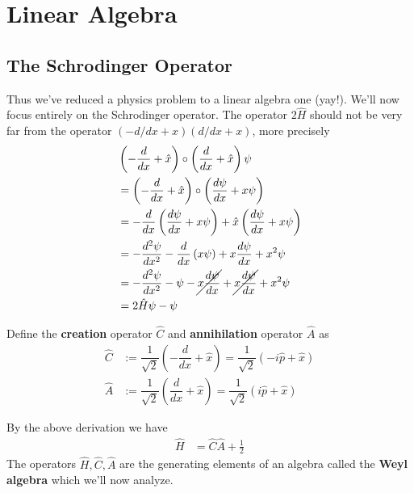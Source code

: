 \section{Linear Algebra}

\subsection{The Schrodinger Operator}
Thus we've reduced a physics problem to a linear algebra one (yay!). We'll now focus entirely on the Schrodinger operator. The operator $2\hat{H}$  should not be very far from the operator $(-d/dx + x)(d/dx + x)$, more precisely
\begin{align*}
	&\left(-\dfrac{d}{dx} + \hat{x}\right) \circ \left(\dfrac{d}{dx} + \hat{x} \right)\psi \\
	&=\left(-\dfrac{d}{dx} + \hat{x}\right) \circ \left(\dfrac{d \psi}{dx} + x \psi \right) \\
	&= -\dfrac{d}{dx}\left( \dfrac{d \psi}{dx} + x \psi \right) + \hat{x} \left( \dfrac{d \psi}{dx} + x \psi \right) \\
	&= -\dfrac{d^2 \psi}{dx^2} -\dfrac{d}{dx} \left(x \psi \right) + x\dfrac{d \psi}{dx} + x^2 \psi \\
	&= -\dfrac{d^2 \psi}{dx^2} -\psi - \cancel{x\dfrac{d\psi}{dx}} + \cancel{x\dfrac{d \psi}{dx}} + x^2 \psi \\
	&= 2\hat{H} \psi - \psi
\end{align*}

\begin{definition}
	Define the \textbf{creation} operator $\hat{C}$ and \textbf{annihilation} operator $\hat{A}$ as
	\begin{align*}
		\hat C &:= \dfrac{1}{\sqrt{2}}\left(-\dfrac{d}{dx} + \hat{x}\right)
		=\dfrac{1}{\sqrt{2}}\left(-i \hat{p} + \hat{x}\right) \\
			\hat A &:= \dfrac{1}{\sqrt{2}}\left(\dfrac{d}{dx} + \hat{x}\right)
		=\dfrac{1}{\sqrt{2}}\left(i \hat{p} + \hat{x}\right)
	\end{align*}
\end{definition}
\noindent By the above derivation we have
\begin{align*}
	\hat{H} &= \hat{C} \hat{A} + \frac{1}{2}
\end{align*}
The operators $\hat{H}, \hat{C}, \hat{A}$ are the generating elements of an algebra called the \textbf{Weyl algebra} which we'll now analyze.












